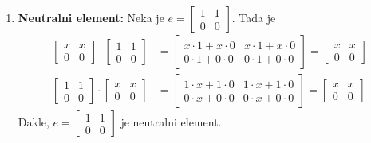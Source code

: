 \documentclass{exam}
\begin{document}
\begin{questions}
\begin{solution}
\begin{enumerate}
    \item \textbf{Neutralni element:} Neka je $\displaystyle e =
      \begin{bmatrix}
        1 & 1\\
        0 & 0
      \end{bmatrix}$. Tada je
      \begin{align*}
        \begin{bmatrix}
          x & x\\
          0 & 0
        \end{bmatrix} \cdot
        \begin{bmatrix}
          1 & 1\\
          0 & 0
        \end{bmatrix} &=
        \begin{bmatrix}
          x \cdot 1 + x \cdot 0 & x \cdot 1 + x \cdot 0\\
          0 \cdot 1 + 0 \cdot 0 & 0 \cdot 1 + 0 \cdot 0
        \end{bmatrix} =
        \begin{bmatrix}
          x & x\\
          0 & 0
        \end{bmatrix}\\
        \begin{bmatrix}
          1 & 1\\
          0 & 0
        \end{bmatrix} \cdot
        \begin{bmatrix}
          x & x\\
          0 & 0
        \end{bmatrix} &=
        \begin{bmatrix}
          1 \cdot x + 1 \cdot 0 & 1 \cdot x + 1 \cdot 0\\
          0 \cdot x + 0 \cdot 0 & 0 \cdot x + 0 \cdot 0
        \end{bmatrix} =
        \begin{bmatrix}
          x & x\\
          0 & 0
        \end{bmatrix}
      \end{align*}
      Dakle, $\displaystyle e =
      \begin{bmatrix}
        1 & 1\\
        0 & 0
      \end{bmatrix}$ je neutralni element.


\end{enumerate}
\end{solution}
\end{questions}
\end{document}
